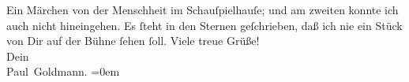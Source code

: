 \begin{ledgroupsized}[t]{13cm}
{{{{                     Ein Märchen von der Menschheit}}}}\label{K_L02910-4h} im Schauſpielhauſe; und am zweiten konnte ich auch nicht hineingehen. Es ſteht in
               den Sternen geſchrieben, daß ich nie ein Stück von Dir auf der Bühne ſehen ſoll.\pend
           \pstart
           Viele treue Grüße! {\\[\baselineskip]}Dein {\\[\baselineskip]}\spacefill\mbox{Paul Goldmann.}\pend
           \leftskip=0em{}
         
         \endnumbering{}\end{ledgroupsized}  \newcommand{\dateiname}{L02910}\newcommand{\titel}{Paul Goldmann an Arthur Schnitzler, 13. 4. [1900]}\newcommand{\editorInnen}{Martin Anton Müller und Laura Untner}
      